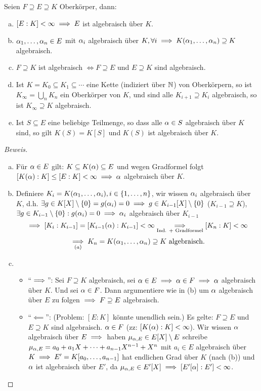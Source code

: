 \documentclass[a4paper]{report}
\begin{document}
\begin{lemm}
  Seien $F \supseteq E \supseteq K$ Oberkörper, dann:
  \begin{enumerate}[(a)]
    \item $[E:K] < \infty \implies E$ ist algebraisch über $K$.
    \item $\alpha_{1}, \ldots, \alpha_{n} \in E$ mit $\alpha_{i}$ algebraisch über $K, \forall i \implies K(\alpha_{1}, \ldots, \alpha_{n}) \supseteq K$ algebraisch.
    \item $F \supseteq K$ ist algebraisch $\iff F \supseteq E$ und $E \supseteq K$ sind algebraisch.
    \item Ist $K = K_{0} \subseteq K_{1} \subseteq \cdots $ eine Kette (indiziert über $\mathbb{N}$) von Oberkörpern, so ist $K_{\infty} = \bigcup_{n} K_{n}$ ein Oberkörper von $K$, und sind alle $K_{i+1}\supseteq K_{i}$ algebraisch, so ist $K_{\infty} \supseteq K$ algebraisch.
    \item Ist $S \subseteq E$ eine beliebige Teilmenge, so dass alle $\alpha \in S$ algebraisch über $K$ sind, so gilt $K(S) = K[S]$ und $K(S)$ ist algebraisch über $K$.
  \end{enumerate}
\begin{proof}[Beweis]
\begin{enumerate}[(a)]
  \item Für $\alpha \in E$ gilt: $K \subseteq K(\alpha) \subseteq E$ und wegen Gradformel folgt $[K(\alpha):K] \le [E:K] < \infty \implies \alpha$ algebraisch über $K$.
  \item Definiere $K_{i} = K(\alpha_{1}, \ldots, \alpha_{i}), i \in \{1, \ldots, n\}$, wir wissen $\alpha_{i}$ algebraisch über $K$, d.h. $\exists g \in K[X] \setminus \{0\} = g(\alpha_{i})=0 \implies g \in K_{i-1}[X] \setminus \{0\}$ ($K_{i-1} \supseteq K$), $\exists g \in K_{i-1} \setminus \{0\} : g(\alpha_{i}) = 0 \implies \alpha_{i}$ algebraisch über $K_{i-1}$
        \[\implies [K_{i}:K_{i-1}] = [K_{i-1}(\alpha): K_{i-1}] < \infty \underset{\text{Ind. + Gradformel}} {\implies} [K_{n}:K] < \infty\]
        \[\underset{(a)}{\implies} K_{n} = K(\alpha_{1}, \ldots, \alpha_{n}) \supseteq K \text{ algebraisch.}\]
  \item \begin{itemize}
          \item ``$\implies$'':
                Sei $F \supseteq K$ algebraisch, sei $\alpha \in E \implies \alpha \in F \implies \alpha$ algebraisch über $K$. Und sei $\alpha \in F$. Dann argumentiere wie in (b) um $\alpha$ algebraisch über $E$ zu folgen $\implies F \supseteq E$ algebraisch.
          \item ``$\impliedby$'': (Problem: $[E:K]$ könnte unendlich sein.) Es gelte: $F \supseteq E$ und $E \supseteq K$ sind algebraisch. $\alpha \in F$ (zz: $[K(\alpha) : K] < \infty$). Wir wissen $\alpha$ algebraisch über $E \implies $ haben $\mu_{\alpha, E} \in E[X] \setminus E$ schreibe $\mu_{\alpha, E} = a_{0} + a_{1}X + \cdots + a_{n-1}X^{n-1} + X^{n}$ mit $a_{i} \in E$ algebraisch über $K \implies E' = K[a_{0}, \ldots, a_{n-1}]$ hat endlichen Grad über $K$ (nach (b)) und $\alpha$ ist algebraisch über $E'$, da $\mu_{\alpha, E} \in E'[X] \implies [E'[\alpha]:E'] < \infty$.

\end{itemize}
\end{enumerate}
\end{proof}
\end{lemm}
\end{document}
